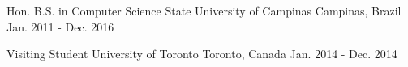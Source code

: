 

\begin{cventries}

  \cventry
    {Hon. B.S. in Computer Science} %
    {State University of Campinas} %
    {Campinas, Brazil} %
    {Jan. 2011 - Dec. 2016} %
    {}

  \cventry
    {Visiting Student} %
    {University of Toronto} %
    {Toronto, Canada} %
    {Jan. 2014 - Dec. 2014} %
    {}

\end{cventries}
